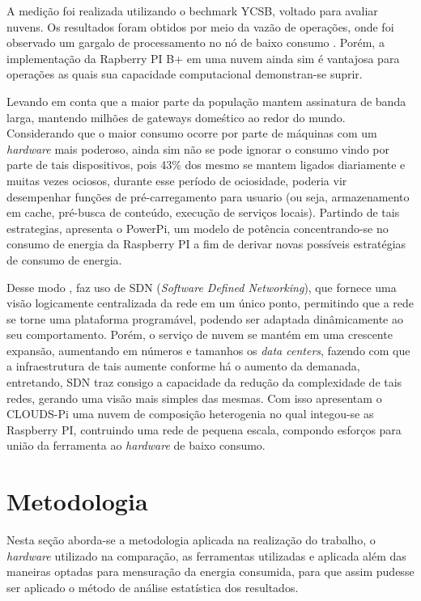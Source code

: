 \documentclass[12pt]{article}
\begin{document}
  A medição foi realizada utilizando o bechmark YCSB, voltado para avaliar nuvens. Os resultados foram obtidos por meio da vazão de operações, onde foi observado um gargalo de processamento no nó de baixo consumo %
. Porém, a implementação da Rapberry PI B+ em uma nuvem ainda sim é vantajosa para operações as quais sua capacidade computacional demonstran-se suprir.


  Levando em conta que a maior parte da população mantem assinatura de banda larga, mantendo milhões de gateways domeśtico ao redor do mundo.
  Considerando que o maior consumo ocorre por parte de máquinas com um \textit{hardware} mais poderoso, ainda sim não se pode ignorar o consumo vindo por parte de tais dispositivos, pois 43\% dos mesmo se mantem ligados diariamente e muitas vezes ociosos, durante esse período de ociosidade, poderia vir desempenhar funções de pré-carregamento para usuario (ou seja, armazenamento em cache, pré-busca de conteúdo, execução de serviços locais).
Partindo de tais estrategias, \cite{PiConsumo} apresenta o PowerPi, um modelo de potência concentrando-se no consumo de energia da Raspberry PI a fim de derivar novas possíveis estratégias de consumo de energia.

  Desse modo \cite{2018CLOUDSPiA}, faz uso de SDN (\textit{Software Defined Networking}), que fornece uma visão logicamente centralizada da rede em um único ponto, permitindo que a rede se torne uma plataforma programável, podendo ser adaptada dinâmicamente ao seu comportamento. Porém, o serviço de nuvem se mantém em uma crescente expansão, aumentando em números e tamanhos os %
  \textit{data centers}, fazendo com que a infraestrutura de tais aumente conforme há o aumento da demanada, entretando, SDN traz consigo a capacidade da redução da complexidade de tais redes, gerando uma visão mais simples das mesmas. Com isso apresentam o CLOUDS-Pi uma nuvem de composição heterogenia no qual integou-se as Raspberry PI,%
  contruindo uma rede de pequena escala, compondo esforços para união da ferramenta ao \textit{hardware} de baixo consumo.    
  


\section{Metodologia} \label{sec:metodologia}
  Nesta seção aborda-se a metodologia aplicada na realização do trabalho, o \textit{hardware} utilizado na comparação, as ferramentas utilizadas e aplicada além das maneiras optadas para mensuração da energia consumida, para que assim pudesse ser aplicado o método de análise estatística dos resultados.
\end{document}
